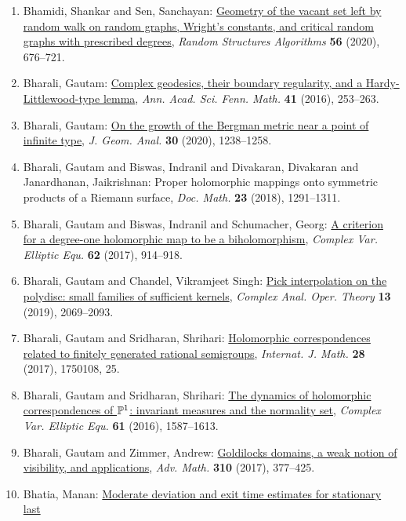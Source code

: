 \begin{enumerate}
{structure of maximal components}, \emph{Electron. J. Probab.} {\bf 25} (2020), Paper No. 47, 57.
\item Bhamidi, Shankar and Sen, Sanchayan: \href{https://doi.org/10.1002/rsa.20880}{Geometry of the vacant set left by random walk on random
graphs, {W}right's constants, and critical random graphs with
prescribed degrees}, \emph{Random Structures Algorithms} {\bf 56} (2020), 676--721.
\item Bharali, Gautam: \href{https://doi.org/10.5186/aasfm.2016.4116}{Complex geodesics, their boundary regularity, and a
{H}ardy-{L}ittlewood-type lemma}, \emph{Ann. Acad. Sci. Fenn. Math.} {\bf 41} (2016), 253--263.
\item Bharali, Gautam: \href{https://doi.org/10.1007/s12220-019-00342-9}{On the growth of the {B}ergman metric near a point of infinite
type}, \emph{J. Geom. Anal.} {\bf 30} (2020), 1238--1258.
\item Bharali, Gautam and Biswas, Indranil and Divakaran, Divakaran
and Janardhanan, Jaikrishnan: Proper holomorphic mappings onto symmetric products of a
{R}iemann surface, \emph{Doc. Math.} {\bf 23} (2018), 1291--1311.
\item Bharali, Gautam and Biswas, Indranil and Schumacher, Georg: \href{https://doi.org/10.1080/17476933.2016.1252342}{A criterion for a degree-one holomorphic map to be a
biholomorphism}, \emph{Complex Var. Elliptic Equ.} {\bf 62} (2017), 914--918.
\item Bharali, Gautam and Chandel, Vikramjeet Singh: \href{https://doi.org/10.1007/s11785-017-0701-5}{Pick interpolation on the polydisc: small families of
sufficient kernels}, \emph{Complex Anal. Oper. Theory} {\bf 13} (2019), 2069--2093.
\item Bharali, Gautam and Sridharan, Shrihari: \href{https://doi.org/10.1142/S0129167X17501087}{Holomorphic correspondences related to finitely generated
rational semigroups}, \emph{Internat. J. Math.} {\bf 28} (2017), 1750108, 25.
\item Bharali, Gautam and Sridharan, Shrihari: \href{https://doi.org/10.1080/17476933.2016.1185419}{The dynamics of holomorphic correspondences of {$\Bbb P^1$}:
invariant measures and the normality set}, \emph{Complex Var. Elliptic Equ.} {\bf 61} (2016), 1587--1613.
\item Bharali, Gautam and Zimmer, Andrew: \href{https://doi.org/10.1016/j.aim.2017.02.005}{Goldilocks domains, a weak notion of visibility, and
applications}, \emph{Adv. Math.} {\bf 310} (2017), 377--425.
\item Bhatia, Manan: \href{https://doi.org/10.1007/s10955-020-02632-x}{Moderate deviation and exit time estimates for stationary last
}
\end{enumerate}
